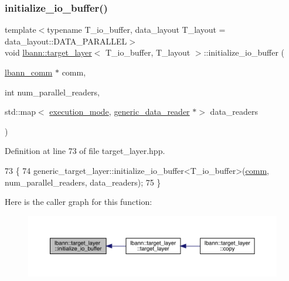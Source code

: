 \subsubsection{\texorpdfstring{initialize\+\_\+io\+\_\+buffer()}{initialize\_io\_buffer()}}
{\footnotesize\ttfamily template$<$typename T\+\_\+io\+\_\+buffer, data\+\_\+layout T\+\_\+layout = data\+\_\+layout\+::\+D\+A\+T\+A\+\_\+\+P\+A\+R\+A\+L\+L\+EL$>$ \\
void \hyperlink{classlbann_1_1target__layer}{lbann\+::target\+\_\+layer}$<$ T\+\_\+io\+\_\+buffer, T\+\_\+layout $>$\+::initialize\+\_\+io\+\_\+buffer (\begin{DoxyParamCaption}\item[{\hyperlink{classlbann_1_1lbann__comm}{lbann\+\_\+comm} $\ast$}]{comm,  }\item[{int}]{num\+\_\+parallel\+\_\+readers,  }\item[{std\+::map$<$ \hyperlink{base_8hpp_a2781a159088df64ed7d47cc91c4dc0a8}{execution\+\_\+mode}, \hyperlink{classlbann_1_1generic__data__reader}{generic\+\_\+data\+\_\+reader} $\ast$$>$}]{data\+\_\+readers }\end{DoxyParamCaption})\hspace{0.3cm}{\ttfamily [inline]}}



Definition at line 73 of file target\+\_\+layer.\+hpp.


\begin{DoxyCode}
73                                                                                                            
                                      \{
74     generic\_target\_layer::initialize\_io\_buffer<T\_io\_buffer>(\hyperlink{file__io_8cpp_ab048c6f9fcbcfaa57ce68b00263dbebe}{comm}, num\_parallel\_readers, data\_readers);
75   \}
\end{DoxyCode}
Here is the caller graph for this function\+:\nopagebreak
\begin{figure}[H]
\begin{center}
\leavevmode
\includegraphics[width=350pt]{classlbann_1_1target__layer_a566c3d94992d4cbc4f17b4084664cc34_icgraph}
\end{center}
\end{figure}
\mbox{\label{classlbann_1_1target__layer_a5ff0ef949286e2eb336c1baf10ed6df6}} 
